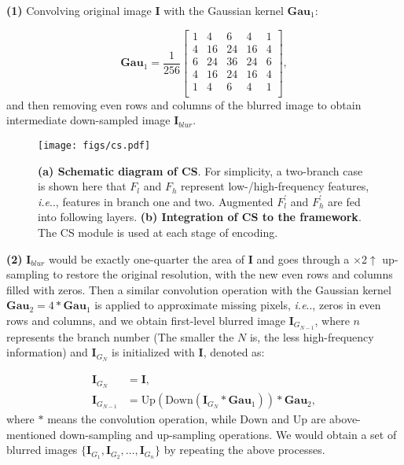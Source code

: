 \documentclass[lettersize,journal]{IEEEtran}
\makeatletter
\DeclareRobustCommand\onedot{\futurelet\@let@token\@onedot}
\def\@onedot{\ifx\@let@token.\else.\null\fi\xspace}
\def\ie{\emph{i.e}\onedot} \def\Ie{\emph{I.e}\onedot}
\makeatother
\begin{document}
\noindent\textbf{(1)} Convolving original image $\bm{I}$ with the Gaussian kernel $\bm{Gau}_1$:

\begin{equation}
    \bm{Gau}_1 = \frac{1}{256}\left[\begin{array}{ccccc}
    1&4&6&4&1\\
    4&16&24&16&4\\
    6&24&36&24&6\\
    4&16&24&16&4\\
    1&4&6&4&1\\
    \end{array}\right],
\end{equation}
and then removing even rows and columns of the blurred image to obtain intermediate down-sampled image $\bm{I}_{blur}$.
\begin{figure*}[t]
    \centering
    \texttt{[image: figs/cs.pdf]}
    \caption{\textbf{(a) Schematic diagram of CS}. For simplicity, a two-branch case is shown here that $F_l$ and $F_h$ represent low-/high-frequency features, \ie, features in branch one and two. Augmented $F_{l}^{'}$ and $F_{h}^{'}$ are fed into following layers. \textbf{(b) Integration of CS to the framework}. The CS module is used at each stage of encoding.}
    \label{fig:atten}
\end{figure*}

\noindent\textbf{(2)} $\bm{I}_{blur}$ would be exactly one-quarter the area of $\bm{I}$ and goes through a $\times$2$\uparrow$ up-sampling to restore the original resolution, with the new even rows and columns filled with zeros. Then a similar convolution operation with the Gaussian kernel $\bm{Gau}_2 = 4 * \bm{Gau}_1$ is applied to approximate missing pixels, \ie, zeros in even rows and columns, and we obtain first-level blurred image $\bm{I}_{G_{N-1}}$, where $n$ represents the branch number (The smaller the $N$ is, the less high-frequency information) and $\bm{I}_{G_{N}}$ is initialized with $\bm{I}$, denoted as:

\begin{equation}
\begin{aligned}
    \bm{I}_{G_{N}}      &= \bm{I},\\
    \bm{I}_{G_{N-1}}    &= \text{Up}(\text{Down}(\bm{I}_{G_{N}} * \bm{Gau}_1)) * \bm{Gau}_2,
\end{aligned}
\end{equation}
where $*$ means the convolution operation, while $\text{Down}$ and $\text{Up}$ are above-mentioned down-sampling and up-sampling operations. We would obtain a set of blurred images $\{\bm{I}_{G_{1}}, \bm{I}_{G_{2}}, \dots, \bm{I}_{G_{n}}\}$ by repeating the above processes. 
\end{document}
